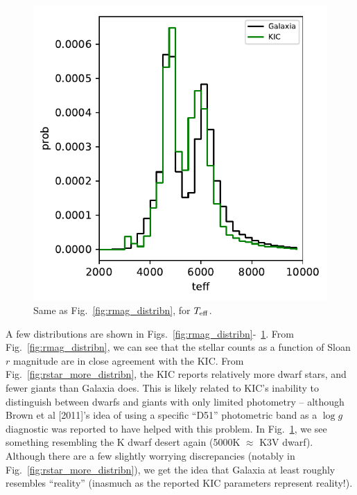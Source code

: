 \documentclass{emulateapj}
\begin{document}
\begin{figure}[!t]
	\begin{center}
		\includegraphics[scale=.8]{figures/teff_distribn.pdf}
	\end{center}
	\caption{Same as Fig.~\ref{fig:rmag_distribn}, for $T_{\rm eff}$.}
	\label{fig:teff_distribn}
\end{figure}

A few distributions are shown in 
Figs.~\ref{fig:rmag_distribn}-~\ref{fig:teff_distribn}.
From Fig.~\ref{fig:rmag_distribn}, we can see that the stellar counts as a 
function of Sloan $r$ magnitude are in close agreement with the KIC.
From Fig.~\ref{fig:rstar_more_distribn}, the KIC reports relatively more dwarf 
stars, and fewer giants than Galaxia does.
This is likely related to KIC's inability to distinguish between dwarfs and 
giants with only limited photometry -- although Brown et al [2011]'s idea of 
using a specific ``D51'' photometric band as a $\log g$ diagnostic was reported 
to have helped with this problem.
In Fig.~\ref{fig:teff_distribn}, we see something resembling the K dwarf desert 
again (5000K $\approx$ K3V dwarf).
Although there are a few slightly worrying discrepancies (notably in 
Fig.~\ref{fig:rstar_more_distribn}), we get the idea that Galaxia at least 
roughly resembles ``reality'' (inasmuch as the reported KIC parameters 
represent reality!).
\end{document}
